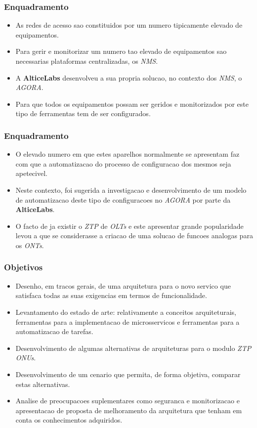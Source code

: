 \begin{frame}
    \frametitle{Enquadramento}
    \begin{itemize} 
        \item As redes de acesso sao constituidos por um numero tipicamente
        elevado de equipamentos.
        \item Para gerir e monitorizar um numero tao elevado de equipamentos sao
        necessarias plataformas centralizadas, os \textit{NMS}.
        \item A \textbf{AlticeLabs} desenvolveu a sua propria solucao, no
        contexto dos \textit{NMS}, o \textit{AGORA}. 
        \item Para que todos os equipamentos possam ser geridos e monitorizados
        por este tipo de ferramentas tem de ser configurados. 
    \end{itemize}
\end{frame}

\begin{frame}
    \frametitle{Enquadramento}
    \begin{itemize}
        \item O elevado numero em que estes aparelhos normalmente se apresentam
        faz com que a automatizacao do processo de configuracao dos mesmos seja
        apetecivel.
        \item Neste contexto, foi sugerida a investigacao e desenvolvimento de
        um modelo de automatizacao deste tipo de configuracoes no \textit{AGORA}
        por parte da \textbf{AlticeLabs}. 
        \item O facto de ja existir o \textit{ZTP} de \textit{OLTs} e este
        apresentar grande popularidade levou a que se considerasse a criacao de
        uma solucao de funcoes analogas para os \textit{ONTs}. 
    \end{itemize}
\end{frame}

\begin{frame}
    \frametitle{\checkmark \hspace{1mm} Objetivos}
    \begin{itemize}
        \item Desenho, em tracos gerais, de uma arquitetura para o novo servico
        que satisfaca todas as suas exigencias em termos de funcionalidade. 
        \item Levantamento do estado de arte: relativamente a conceitos
        arquiteturais, ferramentas para a implementacao de microsservicos e
        ferramentas para a automatizacao de tarefas.
        \item Desenvolvimento de algumas alternativas de arquiteturas para o
        modulo \textit{ZTP ONUs}.
        \item Desenvolvimento de um cenario que permita, de forma objetiva,
        comparar estas alternativas. 
        \item Analise de preocupacoes suplementares como seguranca e
        monitorizacao e apresentacao de proposta de melhoramento da arquitetura
        que tenham em conta os conhecimentos adquiridos. 
    \end{itemize}
\end{frame}